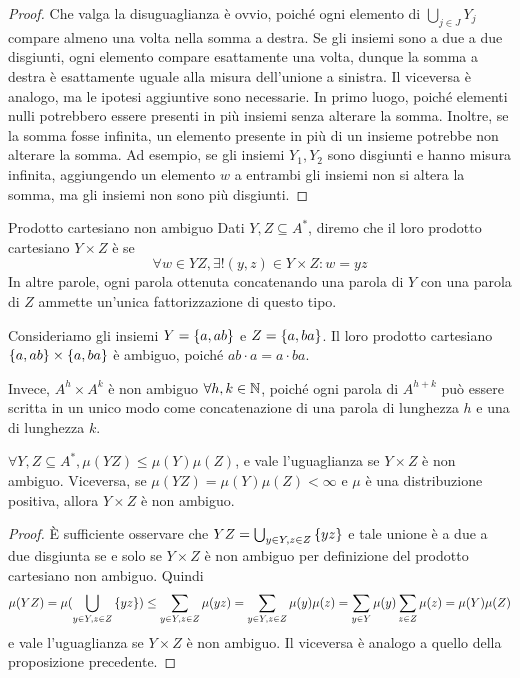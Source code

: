 \begin{proof}
  Che valga la disuguaglianza è ovvio, poiché ogni elemento di \(\bigcup_{j \in J}Y_j\) compare almeno una volta nella somma a destra.
  Se gli insiemi sono a due a due disgiunti, ogni elemento compare esattamente una volta, dunque la somma a destra è esattamente uguale alla misura dell'unione a sinistra.
  Il viceversa è analogo, ma le ipotesi aggiuntive sono necessarie.
  In primo luogo, poiché elementi nulli potrebbero essere presenti in più insiemi senza alterare la somma.
  Inoltre, se la somma fosse infinita, un elemento presente in più di un insieme potrebbe non alterare la somma.
  Ad esempio, se gli insiemi \(Y_1,Y_2\) sono disgiunti e hanno misura infinita, aggiungendo un elemento \(w\) a entrambi gli insiemi non si altera la somma, ma gli insiemi non sono più disgiunti.
\end{proof}

\begin{definition}{Prodotto cartesiano non ambiguo}
  Dati \(Y,Z \subseteq A^*\), diremo che il loro prodotto cartesiano \(Y\times Z\) è  se
    \[\forall w \in YZ, \exists! (y,z) \in Y \times Z : w = yz\]
  In altre parole, ogni parola ottenuta concatenando una parola di \(Y\) con una parola di \(Z\) ammette un'unica fattorizzazione di questo tipo.
\end{definition}

\begin{example}[label=ex:non_ambiguos_prod]{}
  Consideriamo gli insiemi \(Y = \set{a,ab}\) e \(Z = \set{a,ba}\).
  Il loro prodotto cartesiano \(\set{a,ab}\times\set{a,ba}\) è ambiguo, poiché \(ab\cdot a = a\cdot ba\).

  Invece, \(A^h\times A^k\) è non ambiguo \(\forall h,k \in \mathbb{N}\), poiché ogni parola di \(A^{h+k}\) può essere scritta in un unico modo come concatenazione di una parola di lunghezza \(h\) e una di lunghezza \(k\).
\end{example}
\begin{proposition}[label=prop:distribution_distributivity_over_product]{}
  \(\forall Y,Z \subseteq A^*, \mu(YZ) \leq \mu(Y)\mu(Z)\), e vale l'uguaglianza se \(Y\times Z\) è non ambiguo.
  Viceversa, se \(\mu(YZ) = \mu(Y)\mu(Z) < \infty\) e \(\mu\) è una distribuzione positiva, allora \(Y\times Z\) è non ambiguo.
\end{proposition}
\begin{proof}
  È sufficiente osservare che \(YZ = \bigcup_{y\in Y, z \in Z}\set{yz}\) e tale unione è a due a due disgiunta se e solo se \(Y\times Z\) è non ambiguo per definizione del prodotto cartesiano non ambiguo.
  Quindi
  \[\mu(YZ) = \mu(\bigcup_{y\in Y, z \in Z}\set{yz}) \leq \sum_{y\in Y, z \in Z}\mu(yz) = \sum_{y\in Y, z \in Z}\mu(y)\mu(z) =\sum_{y \in Y}\mu(y) \sum_{z \in Z}\mu(z) = \mu(Y)\mu(Z)\]
  e vale l'uguaglianza se \(Y\times Z\) è non ambiguo.
  Il viceversa è analogo a quello della proposizione precedente.
\end{proof}

